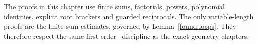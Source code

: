 The proofs in this chapter use finite sums, factorials, powers,
polynomial identities, explicit root brackets and guarded reciprocals.
The only variable-length proofs are the finite sum estimates, governed
by Lemma~\ref{found:loops}. They therefore respect the same first-order
\ipra\ discipline as the exact geometry chapters.
